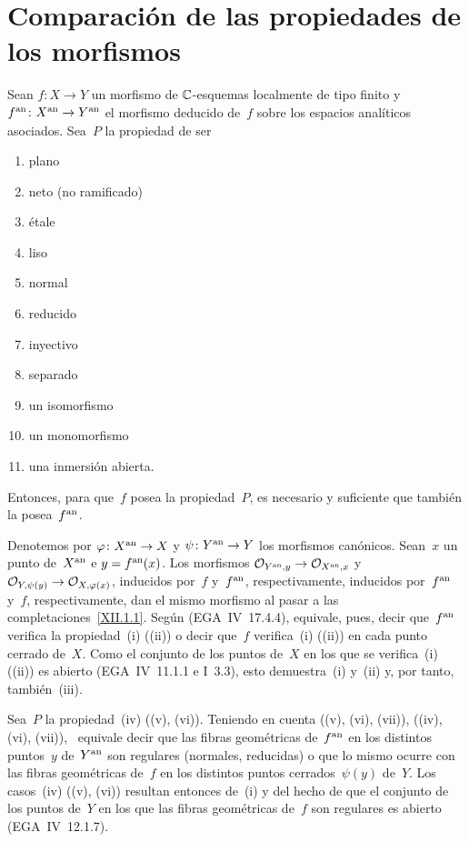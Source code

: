 
\section{Comparación de las propiedades de los morfismos}
\label{XII.3}

\begin{proposition}
\label{XII.3.1}
Sean $f\colon X\to Y$ un morfismo de $\CC$-esquemas localmente de tipo
finito y $f^\an\colon X^\an\to Y^\an$ el morfismo deducido de~$f$ sobre los
espacios analíticos asociados. Sea~$P$ la propiedad de ser
\begin{enumerate}
\item[(i)] plano
\item[(ii)] neto (\ie no ramificado)
\item[(iii)] étale
\item[(iv)] liso
\item[(v)] normal
\item[(vi)]
reducido
\item[(vii)] inyectivo
\item[(viii)] separado
\item[(ix)] un isomorfismo
\item[(x)] un monomorfismo
\item[(xi)] una inmersión abierta.
\end{enumerate}
Entonces, para que~$f$ posea la propiedad~$P$, es necesario y suficiente que
también la posea~$f^\an$.
\end{proposition}

Denotemos por $\varphi\colon X^\an\to X$ y $\psi\colon Y^\an\to Y$ los
morfismos canónicos. Sean~$x$ un punto de~$X^\an$ e $y=f^\an(x)$. Los
morfismos $\cal{O}_{Y^\an,y}\to{\mathcal O}_{X^\an,x}$ y
$\cal{O}_{Y,\psi(y)}\to\cal{O}_{X,\varphi(x)}$,
{inducidos por~$f$ y~$f^\an$, respectivamente,}
{inducidos por~$f^\an$ y~$f$, respectivamente,}%
dan el mismo morfismo al pasar a las completaciones~\eqref{XII.1.1}. Según
\cite[ch \S 5 prop]{XII.2} (\resp EGA~IV~17.4.4), equivale,
pues, decir que~$f^\an$ verifica la propiedad~(i) (\resp (ii)) o decir que~$f$
verifica~(i) (\resp (ii)) en cada punto cerrado de~$X$. Como el conjunto de
los puntos de~$X$ en los que se verifica~(i) (\resp (ii)) es abierto
(EGA~IV~11.1.1 e I~3.3), esto demuestra~(i) y~(ii) y, por tanto,
también~(iii).

{\enlargethispage{.5cm}}%
Sea~$P$ la propiedad~(iv) (\resp (v), \resp (vi)). Teniendo en cuenta
{((v), (vi), (vii)),}
{((iv), (vi), (vii)),}%
~equivale decir que las fibras geométricas de~$f^\an$ en los distintos
puntos~$y$ de~$Y^\an$ son regulares (\resp normales, \resp reducidas) o que
lo mismo ocurre con las fibras geométricas de~$f$ en los distintos puntos
cerrados~$\psi(y)$ de~$Y$. Los casos~(iv) (\resp (v), \resp (vi)) resultan
entonces de~(i) y del hecho de que el conjunto de los puntos de~$Y$ en los
que las fibras geométricas de~$f$ son regulares es abierto
(EGA~IV~12.1.7).

